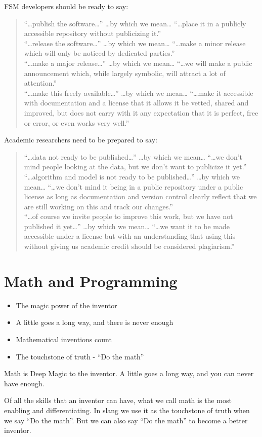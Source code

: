 \documentclass[
	fontsize=10pt, %
	twoside=false, %
	secnumdepth=1, %
]{kaobook}
\begin{document}
FSM developers should be ready to say:
\blockquote{
“…publish the software…” …by which we mean… “…place it in a publicly accessible repository without publicizing it.” \\
“…release the software…” …by which we mean… “…make a minor release which will only be noticed by dedicated parties.” \\
“…make a major release…” …by which we mean… “…we will make a public announcement which, while largely symbolic, will attract a lot of attention.” \\
“…make this freely available…” …by which we mean… “…make it accessible with documentation and a license that it allows it be vetted, shared and improved, but does not carry with it any expectation that it is perfect, free or error, or even works very well.”
}
Academic researchers need to be prepared to say:
\blockquote{
“…data not ready to be published…” …by which we mean… “…we don’t mind people looking at the data, but we don’t want to publicize it yet.” \\
“…algorithm and model is not ready to be published…” …by which we mean… “…we don’t mind it being in a public repository under a public license as long as documentation and version control clearly reflect that we are still working on this and track our changes.” \\
  “…of course we invite people to improve this work, but we have not published it yet…” …by which we mean… “…we want it to be made accessible under a license but with an understanding that using this without giving us academic credit should be considered plagiarism.” \\
  }

\chapter{Math and Programming}

\begin{itemize}
\item The magic power of the inventor
\item A little goes a long way, and there is never enough
\item Mathematical inventions count
  \item The touchstone of truth - ``Do the math''
\end{itemize}

Math is Deep Magic to the inventor. A little goes a long way,
and you can never have enough.

Of all the skills that an inventor can have, what we call math
is the most enabling and differentiating. In slang we use
it as the touchstone of truth when we say ``Do the math''.
But we can also say ``Do the math'' to become a better inventor.
\end{document}
